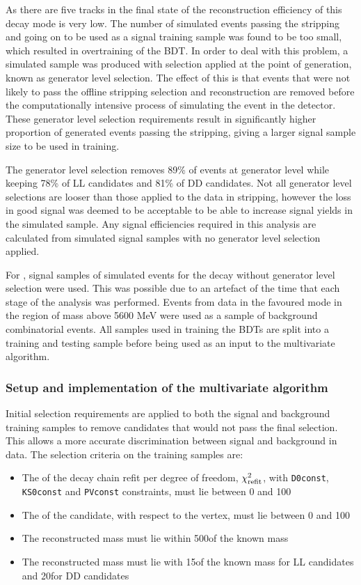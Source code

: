 As there are five tracks in the final state of \kpi the reconstruction efficiency of this decay mode is very low. The number of simulated events passing the stripping and going on to be used as a signal training sample was found to be too small, which resulted in overtraining of the BDT. In order to deal with this problem, a simulated sample was produced with selection applied at the point of generation, known as generator level selection. The effect of this is that events that were not likely to pass the offline stripping selection and reconstruction are removed before the computationally intensive process of simulating the event in the \lhcb detector. These generator level selection requirements result in significantly higher proportion of generated events passing the stripping, giving a larger signal sample size to be used in training.

The generator level selection removes 89\% of events at generator level while keeping 78\% of LL candidates and 81\% of DD candidates. Not all generator level selections are looser than those applied to the data in stripping, however the loss in good signal was deemed to be acceptable to be able to increase signal yields in the simulated sample. Any signal efficiencies required in this analysis are calculated from simulated signal samples with no generator level selection applied.

For \kpipipi, signal samples of simulated events  for the decay \kpipipi without generator level selection were used. This was possible due to an artefact of the time that each stage of the analysis was performed. Events from data in the favoured \kpipipi mode in the region of \Bm mass above 5600 MeV were used as a sample of background combinatorial events. All samples used in training the BDTs are split into a training and testing sample before being used as an input to the multivariate algorithm.

\subsubsection{Setup and implementation of the multivariate algorithm}

Initial selection requirements are applied to both the signal and background training samples to remove candidates that would not pass the final selection. This allows a more accurate discrimination between signal and background in data. The selection criteria on the training samples are:

\begin{itemize}
\item The \chisq of the decay chain refit per degree of freedom, $\chi^2_\text{refit}$, with {\tt D0const}, {\tt KS0const} and {\tt PVconst} constraints, must lie between 0 and 100
\item The \chisqip of the \Bm candidate, with respect to the \Bm vertex, must lie between 0 and 100
\item The reconstructed \Kstarm mass must lie within 500\mev of the known \Kstarm mass
\item The reconstructed \KS mass must lie with 15\mev of the known \KS mass for LL candidates and 20\mev for DD candidates
\end{itemize}

